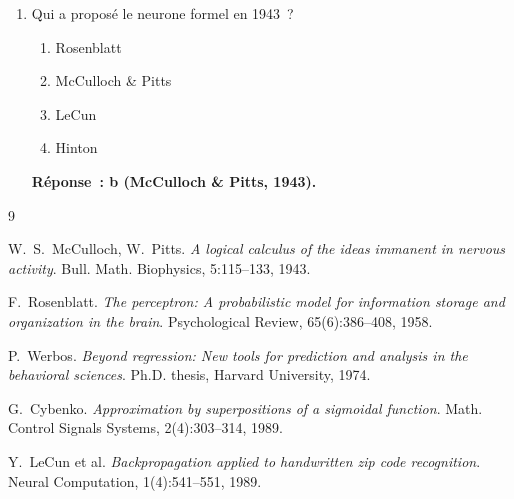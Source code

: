 \documentclass[a4paper,11pt]{article}
\theoremstyle{definition}
\theoremstyle{remark}
\begin{document}
\begin{enumerate}
  \item Qui a propos\'e le neurone formel en 1943~?
    \begin{enumerate}
      \item Rosenblatt
      \item McCulloch \& Pitts
      \item LeCun
      \item Hinton
    \end{enumerate}
    \textbf{R\'eponse~: b (McCulloch \& Pitts, 1943).}

\end{enumerate}

\begin{thebibliography}{9}

  W.~S.~McCulloch, W.~Pitts.
  \newblock \emph{A logical calculus of the ideas immanent in
    nervous activity}.
  \newblock Bull. Math. Biophysics, 5:115--133, 1943.

  F.~Rosenblatt.
  \newblock \emph{The perceptron: A probabilistic model for
    information storage and organization in the brain}.
  \newblock Psychological Review, 65(6):386--408, 1958.

  P.~Werbos.
  \newblock \emph{Beyond regression: New tools for prediction and
    analysis in the behavioral sciences}.
  \newblock Ph.D. thesis, Harvard University, 1974.

  G.~Cybenko.
  \newblock \emph{Approximation by superpositions of a sigmoidal
    function}.
  \newblock Math. Control Signals Systems, 2(4):303--314, 1989.

  Y.~LeCun et al.
  \newblock \emph{Backpropagation applied to handwritten zip code
    recognition}.
  \newblock Neural Computation, 1(4):541--551, 1989.

\end{thebibliography}
\end{document}
